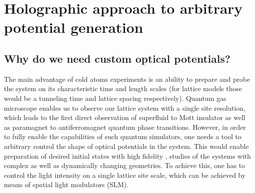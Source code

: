 
\chapter{Holographic approach to arbitrary potential generation}

\section{Why do we need custom optical potentials?}
The main advantage of cold atoms experiments is an ability to prepare and probe the system on its characteristic time and length scales (for lattice models those would be a tunneling time and lattice spacing respectively). Quantum gas microscope enables us to observe our lattice system with a single site resolution, which leads to the first direct observation of superfluid to Mott insulator \cite{Bakr2010, bloch} as well as paramagnet to antiferromagnet \cite{Simon2011, Parsons??} quantum phase transitions. However, in order to fully enable the capabilities of such quantum simulators, one needs a tool to arbitrary control the shape of optical potentials in the system. This would enable preparation of desired initial states with high fidelity \cite{us, somebody else?}, studies of the systems with complex \cite{Tilman QPC, Roatti QPC} as well as dynamically changing \cite{??} geometries. To achieve this, one has to control the light intensity on a single lattice site scale, which can be achieved by means of spatial light modulators (SLM).

